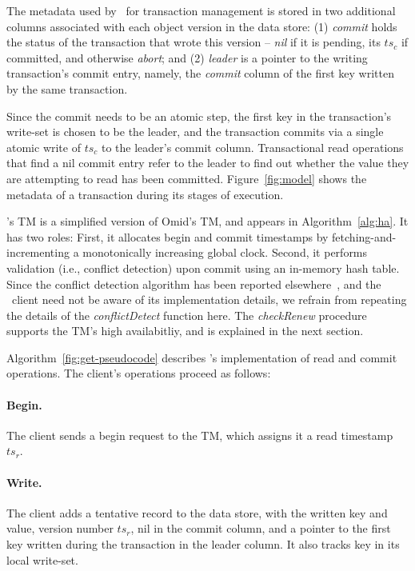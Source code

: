 The metadata used by \sys\ for transaction management is stored in two additional columns associated with each object version in the data store:
(1) \emph{commit} holds the status of the transaction that wrote this version -- \emph{nil} if it is pending, its  $ts_c$ if committed, and 
otherwise \emph{abort}; 
and
(2) \emph{leader} is a pointer to the writing transaction's commit entry, namely, the \emph{commit} column of the first key written by the same
transaction. 

Since the commit needs to be an atomic step, the first key in the transaction's write-set is chosen to be the leader, and the transaction commits via a single atomic write of $ts_c$ to the leader's commit column. Transactional read operations that find a nil commit entry 
refer to the leader to find out whether the value they are attempting to read has been committed.
Figure~\ref{fig:model} shows the metadata of a transaction during its stages of execution. 

\sys's TM is a simplified version of Omid's TM, and appears  in Algorithm~\ref{alg:ha}. It has two roles:
First, it allocates begin and commit timestamps by fetching-and-incrementing a monotonically increasing global clock.
Second, it performs validation (i.e., conflict detection) upon commit using an in-memory hash table. 
Since the conflict detection algorithm has been reported elsewhere~\cite{Omid2017}, and the \sys\ client need not be aware of 
its implementation details, we refrain from repeating the details of the \emph{conflictDetect} function here. 
The  \emph{checkRenew} procedure supports the TM's  high availabitliy, and is explained in the next section.

Algorithm~\ref{fig:get-pseudocode} describes \sys's implementation of read and commit operations.
The client's operations proceed as follows:

\paragraph{Begin.}
The client sends a begin request to the TM, which assigns it a read timestamp $ts_r$.

\paragraph{Write.}
The client adds a tentative record to the data store, with the written key and value, version number $ts_r$, 
nil in the commit column, and a pointer to the first key written during the transaction in the leader column.
It also tracks key in its local write-set.


